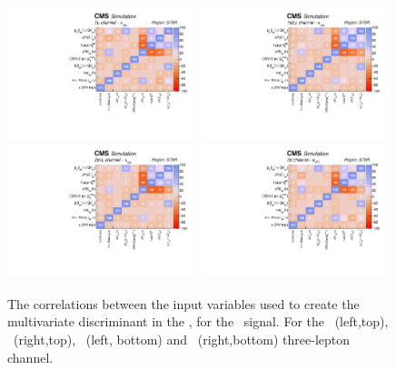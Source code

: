 \begin{figure}[htbp]
	\centering
	\includegraphics[width=0.49\textwidth]{6_Search/Figures/PlotsTechnics/correlationsigZutsingletopuuu}
	\includegraphics[width=0.49\textwidth]{6_Search/Figures/PlotsTechnics/correlationsigZutsingletopuue}
	\includegraphics[width=0.49\textwidth]{6_Search/Figures/PlotsTechnics/correlationsigZutsingletopeeu}
	\includegraphics[width=0.49\textwidth]{6_Search/Figures/PlotsTechnics/correlationsigZutsingletopeee}
	\caption{The correlations between the input variables used to create the multivariate discriminant in the \STSR, for the \Zut\ signal. For the \mumumu\ (left,top), \emumu\ (right,top), \eemu\ (left, bottom) and \eee\ (right,bottom) three-lepton channel.}
	\label{fig:correlationsigzutsingletop}
\end{figure}

